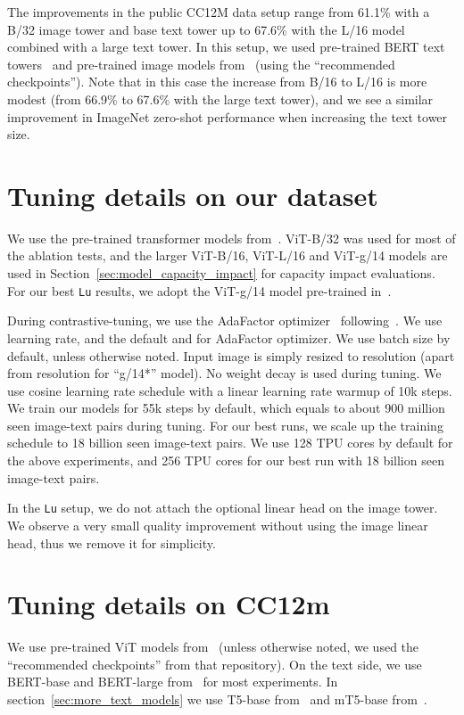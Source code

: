 \documentclass[10pt,twocolumn,letterpaper]{article}
\def \Lu {{\tt Lu}\xspace}
\begin{document}
The improvements in the public CC12M data setup range from 61.1\% with a B/32 image tower and base text tower up to 67.6\% with the L/16 model combined with a large text tower. In this setup, we used pre-trained BERT text towers~\cite{bert} and pre-trained image models from~\cite{augreg} (using the “recommended checkpoints”). Note that in this case the increase from B/16 to L/16 is more modest (from 66.9\% to 67.6\% with the large text tower), and we see a similar improvement in ImageNet zero-shot performance when increasing the text tower size. 



\section{Tuning details on our dataset}
\label{appendix:our_details}
We use the pre-trained transformer models from~\cite{vitg}.
ViT-B/32 was used for most of the ablation tests,
and the larger ViT-B/16, ViT-L/16 and ViT-g/14 models are used in Section~\ref{sec:model_capacity_impact} for capacity impact evaluations.
For our best \Lu results, we adopt the ViT-g/14 model pre-trained in~\cite{vitg}.

During contrastive-tuning, we use the AdaFactor optimizer~\cite{adafactor} following~\cite{vitg}.
We use  learning rate, and the default  and  for AdaFactor optimizer.
We use batch size  by default, unless otherwise noted.
Input image is simply resized to  resolution (apart from  resolution for “g/14*” model).
No weight decay is used during tuning.
We use cosine learning rate schedule with a linear learning rate warmup of 10k steps.
We train our models for 55k steps by default, which equals to about 900 million seen image-text pairs during tuning. 
For our best runs, we scale up the training schedule to 18 billion seen image-text pairs.
We use 128 TPU cores by default for the above experiments, and 256 TPU cores for our best run with 18 billion seen image-text pairs.


In the \Lu setup, we do not attach the optional linear head on the image tower. 
We observe a very small quality improvement without using the image linear head, thus we remove it for simplicity.

\section{Tuning details on CC12m}
\label{appendix:public_details}

We use pre-trained ViT models from~\cite{augreg} (unless otherwise noted, we used the “recommended checkpoints” from that repository). On the text side, we use BERT-base and BERT-large from~\cite{bert} for most experiments. In section~\ref{sec:more_text_models} we use T5-base from~\cite{T5} and mT5-base from~\cite{mt5}.
\end{document}
